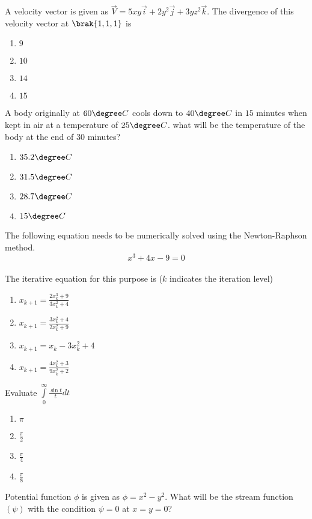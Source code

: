 \item A velocity vector is given as $\vec{V}= 5xy\overrightarrow{i}+2y^2\overrightarrow{j}+3yz^2\overrightarrow{k}$. The divergence of this velocity vector at $\brak{1,1,1}$ is
	\begin{enumerate}
                \item $9$
                \item $10$
                \item $14$
                \item $15$
        \end{enumerate}
\item A body originally at $60{\degree}C$ cools down to $40{\degree}C$ in $15$ minutes when kept in air at a temperature of $25{\degree}C$. what will be the temperature of the body at the end of $30$ minutes?
	\begin{enumerate}
		\item $35.2{\degree}C$
                \item $31.5{\degree}C$
                \item $28.7{\degree}C$
                \item $15{\degree}C$
        \end{enumerate}
\item The following equation needs to be numerically solved using the Newton-Raphson method.\\ $$x^3+4x-9=0$$\\The iterative equation for this purpose is ($k$ indicates the iteration level)
	\begin{enumerate}
		\item $x_{k+1}=\frac{2x_k^3+9}{3x_k^2+4}$
		\item $x_{k+1}=\frac{3x_k^2+4}{2x_k^2+9}$
		\item $x_{k+1}=x_k-3x_k^2+4$
		\item $x_{k+1}=\frac{4x_k^2+3}{9x_k^2+2}$
        \end{enumerate}   
\item Evaluate $\int\limits_{0}^{\infty} \frac{\sin t}{t} dt$
	\begin{enumerate}
                \item $\pi$
		\item $\frac{\pi}{2}$
		\item $\frac{\pi}{4}$
		\item $\frac{\pi}{8}$  
        \end{enumerate}
\item Potential function $\phi$ is given as $\phi=x^2-y^2$. What will be the stream function$(\psi)$ with the condition $\psi=0$ at $x=y=0$?
